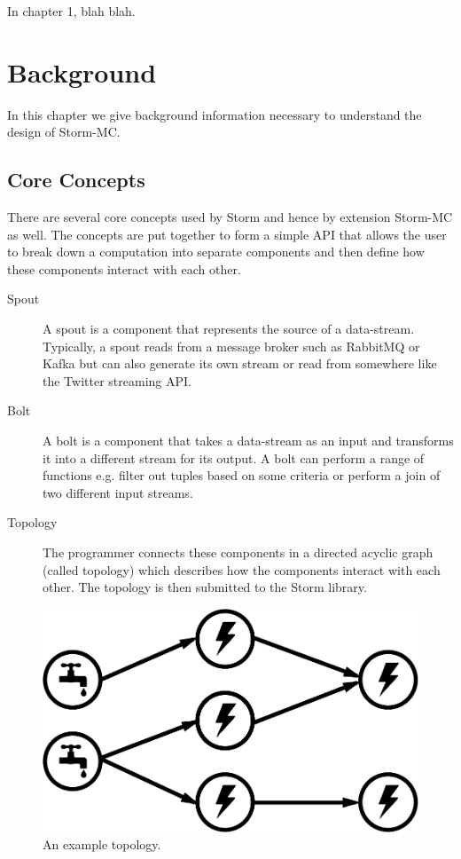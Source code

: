 \documentclass[bsc,logo,frontabs,twoside,singlespacing,normalheadings,parskip]{infthesis}     %
\begin{document}
In chapter 1, blah blah.




\chapter{Background}

In this chapter we give background information necessary to understand the design of Storm-MC.

\section{Core Concepts}

There are several core concepts used by Storm and hence by extension Storm-MC as well. The concepts are put together to form a simple API that allows the user to break down a computation into separate components and then define how these components interact with each other.

\begin{description}
  \item[Spout] A spout is a component that represents the source of a data-stream. Typically, a spout reads from a message broker such as RabbitMQ or Kafka but can also generate its own stream or read from somewhere like the Twitter streaming API.
  \item[Bolt] A bolt is a component that takes a data-stream as an input and transforms it into a different stream for its output. A bolt can perform a range of functions e.g. filter out tuples based on some criteria or perform a join of two different input streams.
  \item[Topology] The programmer connects these components in a directed acyclic graph (called topology) which describes how the components interact with each other. The topology is then submitted to the Storm library.
\end{description}

\begin{figure}[!htb]
	\centering
	\includegraphics[scale=0.3]{pdf/topology.pdf}
	\caption{An example topology.}
	\label{fig:topology}
\end{figure}
\end{document}
